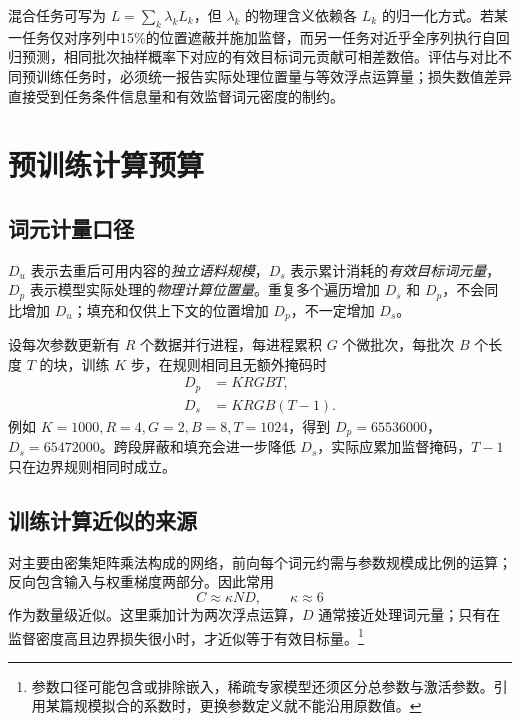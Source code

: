\documentclass[../textbook.tex]{subfiles}
\begin{document}
混合任务可写为 $L=\sum_k\lambda_kL_k$，但 $\lambda_k$ 的物理含义依赖各 $L_k$ 的归一化方式。若某一任务仅对序列中15\%的位置遮蔽并施加监督，而另一任务对近乎全序列执行自回归预测，相同批次抽样概率下对应的有效目标词元贡献可相差数倍。评估与对比不同预训练任务时，必须统一报告实际处理位置量与等效浮点运算量；损失数值差异直接受到任务条件信息量和有效监督词元密度的制约。

\section{预训练计算预算}

\subsection{词元计量口径}
$D_u$ 表示去重后可用内容的\emph{独立语料规模}，$D_s$ 表示累计消耗的\emph{有效目标词元量}，$D_p$ 表示模型实际处理的\emph{物理计算位置量}。重复多个遍历增加 $D_s$ 和 $D_p$，不会同比增加 $D_u$；填充和仅供上下文的位置增加 $D_p$，不一定增加 $D_s$。

设每次参数更新有 $R$ 个数据并行进程，每进程累积 $G$ 个微批次，每批次 $B$ 个长度 $T$ 的块，训练 $K$ 步，在规则相同且无额外掩码时
\begin{equation}\label{eq:pt-budget-count}
\begin{aligned}
 D_p &= KRGBT, \\
 D_s &= KRGB(T-1).
\end{aligned}
\end{equation}
例如 $K=1000,R=4,G=2,B=8,T=1024$，得到 $D_p=65536000$，$D_s=65472000$。跨段屏蔽和填充会进一步降低 $D_s$，实际应累加监督掩码，$T-1$ 只在边界规则相同时成立。


\subsection{训练计算近似的来源}
对主要由密集矩阵乘法构成的网络，前向每个词元约需与参数规模成比例的运算；反向包含输入与权重梯度两部分。因此常用
\begin{equation}
 C\approx\kappa ND,\qquad \kappa\approx6
 \label{eq:pt-compute}
\end{equation}
作为数量级近似。这里乘加计为两次浮点运算，$D$ 通常接近处理词元量；只有在监督密度高且边界损失很小时，才近似等于有效目标量。\footnote{参数口径可能包含或排除嵌入，稀疏专家模型还须区分总参数与激活参数。引用某篇规模拟合的系数时，更换参数定义就不能沿用原数值。}
\end{document}
